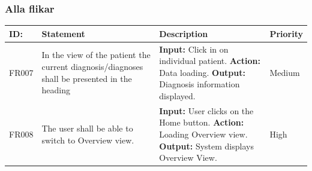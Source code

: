 \documentclass{scrreprt}
\begin{document}
\subsubsection{Alla flikar}
\begin{center}
\begin{tabularx}{\linewidth}{| l | X | X | l |}
\hline
\textbf{ID:} & \textbf{Statement} & \textbf{Description} & \textbf{Priority} \\ 
\hline
FR007 & In the view of the patient the current diagnosis/diagnoses shall be presented in the heading  & \textbf{Input:} Click in on individual patient.
\newline \textbf{Action:} Data loading.
\newline \textbf{Output:} Diagnosis information displayed. & Medium \\ 
\hline
FR008 & The user shall be able to switch to Overview view. & \textbf{Input:} User clicks on the Home button.
\newline \textbf{Action:} Loading Overview view.
\newline \textbf{Output:} System displays Overview View. & High \\ 
\hline
\end{tabularx}
\end{center}
\end{document}
